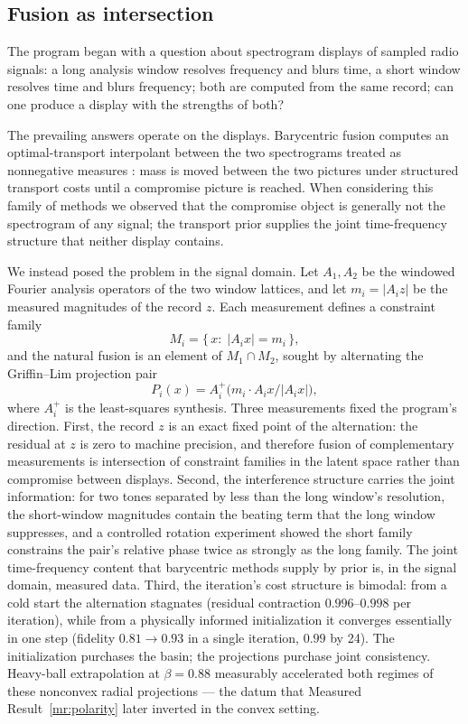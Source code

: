 \documentclass[11pt]{article}
\theoremstyle{definition}
\begin{document}
\subsection{Fusion as intersection}

The program began with a question about spectrogram displays of sampled
radio signals: a long analysis window resolves frequency and blurs time, a
short window resolves time and blurs frequency; both are computed from the
same record; can one produce a display with the strengths of both?

The prevailing answers operate on the displays. Barycentric fusion computes
an optimal-transport interpolant between the two spectrograms treated as
nonnegative measures \cite{otfusion}: mass is moved between the two
pictures under structured transport costs until a compromise picture is
reached. When considering this family of methods we observed that the
compromise object is generally not the spectrogram of any signal; the
transport prior supplies the joint time-frequency structure that neither
display contains.

We instead posed the problem in the signal domain. Let $A_1,A_2$ be the
windowed Fourier analysis operators of the two window lattices, and let
$m_i=|A_i z|$ be the measured magnitudes of the record $z$. Each
measurement defines a constraint family
\[
M_i=\{\,x:\;|A_i x|=m_i\,\},
\]
and the natural fusion is an element of $M_1\cap M_2$, sought by
alternating the Griffin--Lim projection pair \cite{griffinlim}
\[
P_i(x)=A_i^{+}\bigl(m_i\cdot A_i x/|A_i x|\bigr),
\]
where $A_i^+$ is the least-squares synthesis. Three measurements fixed the
program's direction. First, the record $z$ is an exact fixed point of the
alternation: the residual at $z$ is zero to machine precision, and
therefore fusion of complementary measurements is intersection of
constraint families in the latent space rather than compromise between
displays. Second, the interference structure carries the joint information:
for two tones separated by less than the long window's resolution, the
short-window magnitudes contain the beating term that the long window
suppresses, and a controlled rotation experiment showed the short family
constrains the pair's relative phase twice as strongly as the long family.
The joint time-frequency content that barycentric methods supply by prior
is, in the signal domain, measured data. Third, the iteration's cost
structure is bimodal: from a cold start the alternation stagnates (residual
contraction $0.996$--$0.998$ per iteration), while from a physically
informed initialization it converges essentially in one step (fidelity
$0.81\to0.93$ in a single iteration, $0.99$ by 24). The initialization
purchases the basin; the projections purchase joint consistency. Heavy-ball
extrapolation at $\beta=0.88$ measurably accelerated both regimes of these
nonconvex radial projections --- the datum that Measured
Result~\ref{mr:polarity} later inverted in the convex setting.
\end{document}
